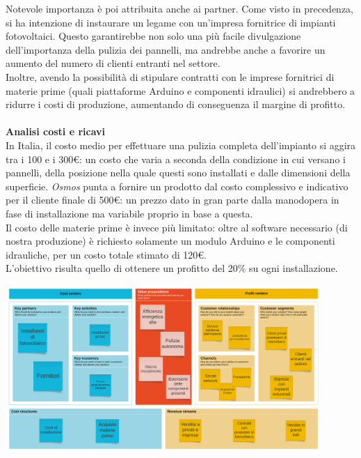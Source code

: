 \documentclass[a4paper, 12pt]{article}
\begin{document}
	Notevole importanza è poi attribuita anche ai partner. Come visto in precedenza, si ha intenzione di instaurare un legame con un'impresa fornitrice di impianti fotovoltaici. Questo garantirebbe non solo una più facile divulgazione dell'importanza della pulizia dei pannelli, ma andrebbe anche a favorire un aumento del numero di clienti entranti nel settore.\\ %
	Inoltre, avendo la possibilità di stipulare contratti con le imprese fornitrici di materie prime (quali piattaforme Arduino e componenti idraulici) si andrebbero a ridurre i costi di produzione, aumentando di conseguenza il margine di profitto.\\\\
	\textbf{Analisi costi e ricavi}\\
	In Italia, il costo medio per effettuare una pulizia completa dell'impianto si aggira tra i 100 e i 300\euro: un costo che varia a seconda della condizione in cui versano i pannelli, della posizione nella quale questi sono installati e dalle dimensioni della superficie. \emph{Osmos} punta a fornire un prodotto dal costo complessivo e indicativo per il cliente finale di 500\euro: un prezzo dato in gran parte dalla manodopera in fase di installazione ma variabile proprio in base a questa.\\
	Il costo delle materie prime è invece più limitato: oltre al software necessario (di nostra produzione) è richiesto solamente un modulo Arduino e le componenti idrauliche, per un costo totale stimato di 120\euro.\\
	L'obiettivo risulta quello di ottenere un profitto del 20\% su ogni installazione.
	\begin{center}
		\includegraphics[width=0.9\textwidth]{Images/BusinessModelCanvas.png}
	\end{center}
\end{document}
